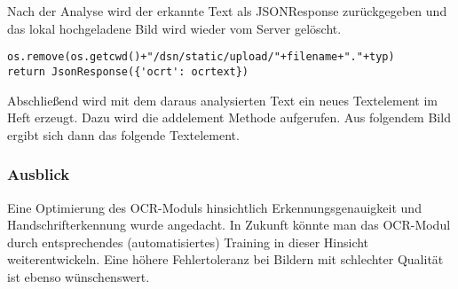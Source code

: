 Nach der Analyse wird der erkannte Text als JSONResponse zurückgegeben und das lokal hochgeladene Bild wird wieder vom Server gelöscht.

\begin{lstlisting}[caption={Fileentfernung und Rückgabe des OCR-Textes}]
os.remove(os.getcwd()+"/dsn/static/upload/"+filename+"."+typ)
return JsonResponse({'ocrt': ocrtext})
\end{lstlisting}

Abschließend wird mit dem daraus analysierten Text ein neues Textelement im Heft erzeugt. Dazu wird die addelement Methode aufgerufen. Aus folgendem Bild ergibt sich dann das folgende Textelement.



\subsubsection{Ausblick}
Eine Optimierung des OCR-Moduls hinsichtlich Erkennungsgenauigkeit und Handschrifterkennung wurde angedacht. In Zukunft könnte man das OCR-Modul durch entsprechendes (automatisiertes) Training in dieser Hinsicht weiterentwickeln. Eine höhere Fehlertoleranz bei Bildern mit schlechter Qualität ist ebenso wünschenswert.

